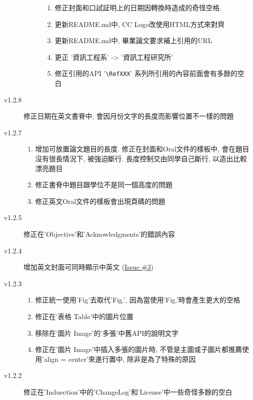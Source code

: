 \begin{description}
\begin{description}
\begin{enumerate}
          \item 修正封面和口試証明上的日期因轉換時造成的奇怪空格.
          \item 更新README.md中, CC Logo改使用HTML方式來對齊
          \item 更新README.md中, 畢業論文要求補上引用的URL
          \item 更正 '資訊工程系' -> '資訊工程研究所'
          \item 修正引用的API '\verb|\RefXXX|' 系列所引用的內容前面會有多餘的空白
        \end{enumerate}
    \end{description}

  \item[v1.2.8] 修正日期在英文書脊中, 會因月份文字的長度而影響位置不一樣的問題

  \item[v1.2.7] \hfill
    \begin{enumerate}
      \item 增加可放置論文題目的長度. 修正在封面和Oral文件的樣板中, 會在題目沒有很長情況下, 被強迫斷行. 長度控制交由同學自己斷行, 以造出比較漂亮題目
      \item 修正書脊中題目跟學位不是同一個高度的問題
      \item 修正英文Oral文件的樣板會出現頁碼的問題
    \end{enumerate}

  \item[v1.2.5] 修正在'Objective'和'Acknowledgments'的錯誤內容

  \item[v1.2.4] 增加英文封面可同時顯示中英文 (\href{https://github.com/wengan-li/ncku-thesis-template-latex/issues/3}{Issue \#3})

  \item[v1.2.3] \hfill
    \begin{enumerate}
      \item 修正統一使用'Fig'去取代'Fig.', 因為當使用'Fig.'時會產生更大的空格
      \item 修正在'表格 Table'中的圖片位置
      \item 移除在'圖片 Image'的'多張'中舊API的說明文字
      \item 修正在'圖片 Image'中插入多張的圖片時, 不管是主圖或子圖片都推薦使用'align = center'來進行置中, 除非是為了特殊的原因
    \end{enumerate}

  \item[v1.2.2] 修正在'Induection'中的'ChangeLog'和'License'中一些奇怪多餘的空白


\end{description}
